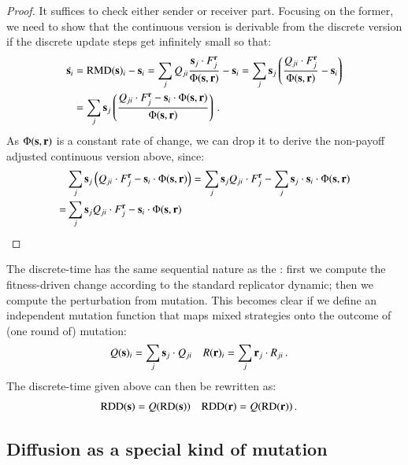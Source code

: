 \begin{proof}
  It suffices to check either sender or receiver part. Focusing on the
  former, we need to show that the continuous version is derivable
  from the discrete version if the discrete update steps get
  infinitely small so that:
  \begin{align*}
    \dot{\mathrm{\mathbf{s}}_i} & = \mathrm{RMD}(\mathrm{\mathbf{s}})_i - \mathrm{\mathbf{s}}_i = \sum_{j} Q_{ji}
    \frac{\mathrm{\mathbf{s}}_j \cdot F_j^{\mathrm{\mathbf{r}}}}{ \Phi(\mathrm{\mathbf{s}},\mathrm{\mathbf{r}})} -
    \mathrm{\mathbf{s}}_i = \sum_{j} \mathrm{\mathbf{s}}_j \left ( \frac{ Q_{ji} \cdot
        F_j^{\mathrm{\mathbf{r}}}}{ \Phi(\mathrm{\mathbf{s}},\mathrm{\mathbf{r}})} - \mathrm{\mathbf{s}}_i \right ) \\
    & = \sum_{j} \mathrm{\mathbf{s}}_j \left ( \frac{ Q_{ji} \cdot
        F_j^{\mathrm{\mathbf{r}}} - \mathrm{\mathbf{s}}_i \cdot \Phi(\mathrm{\mathbf{s}},\mathrm{\mathbf{r}})}{ \Phi(\mathrm{\mathbf{s}},\mathrm{\mathbf{r}})}  \right )\,.
  \end{align*}
  As $\Phi(\mathrm{\mathbf{s}},\mathrm{\mathbf{r}})$ is a constant rate of change, we can drop
  it to derive the non-payoff adjusted continuous version above,
  since:
  \begin{align*}
    & \sum_{j} \mathrm{\mathbf{s}}_j \left ( Q_{ji} \cdot
        F_j^{\mathrm{\mathbf{r}}} - \mathrm{\mathbf{s}}_i \cdot \Phi(\mathrm{\mathbf{s}},\mathrm{\mathbf{r}})  \right
      ) =     \sum_{j} \mathrm{\mathbf{s}}_j  Q_{ji} \cdot
        F_j^{\mathrm{\mathbf{r}}} - \sum_{j} \mathrm{\mathbf{s}}_j \cdot \mathrm{\mathbf{s}}_i \cdot
        \Phi(\mathrm{\mathbf{s}},\mathrm{\mathbf{r}}) \\
       = &    \sum_{j} \mathrm{\mathbf{s}}_j  Q_{ji} \cdot
        F_j^{\mathrm{\mathbf{r}}} - \mathrm{\mathbf{s}}_i \cdot
        \Phi(\mathrm{\mathbf{s}},\mathrm{\mathbf{r}}) 
  \end{align*}
\end{proof}

The discrete-time \rmd has the same sequential nature as the \rdd:
first we compute the fitness-driven change according to the standard
replicator dynamic; then we compute the perturbation from
mutation. This becomes clear if we define an independent mutation
function that maps mixed strategies onto the outcome of (one round of)
mutation: 
\begin{align*}
  Q(\mathrm{\mathbf{s}})_i & =  \sum_j  \mathrm{\mathbf{s}}_j \cdot
  Q_{ji} &   R(\mathrm{\mathbf{r}})_i & =  \sum_{j}  \mathrm{\mathbf{r}}_j \cdot
  R_{ji} \,.
\end{align*}
The discrete-time \rmd given above can then be rewritten as:
\begin{align*}
  \mathrm{RDD}(\mathrm{\mathbf{s}}) &= Q(\mathrm{RD}(\mathrm{\mathbf{s}})) &   \mathrm{RDD}(\mathrm{\mathbf{r}}) &= Q(\mathrm{RD}(\mathrm{\mathbf{r}}))\,. 
\end{align*}



\subsection{Diffusion as a special kind of mutation}

